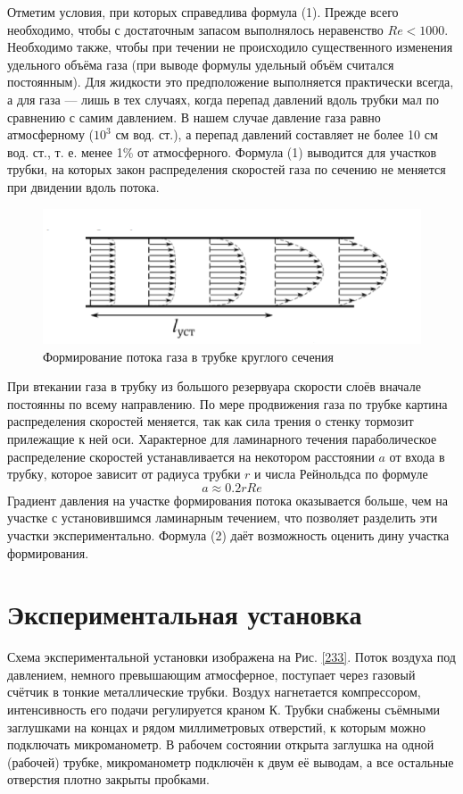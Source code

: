 \documentclass[a4paper, 12pt]{article}
\begin{document}
Отметим условия, при которых справедлива формула (1). Прежде всего необходимо, чтобы с достаточным запасом выполнялось неравенство $Re < 1000$. Необходимо также, чтобы при течении не происходило существенного изменения удельного объёма газа (при выводе формулы удельный объём считался постоянным). Для жидкости это предположение выполняется практически всегда, а для газа --- лишь в тех случаях, когда перепад давлений вдоль трубки мал по сравнению с самим давлением. В нашем случае давление газа равно атмосферному ($10^3$ см вод. ст.), а перепад давлений составляет не более 10 см вод. ст., т. е. менее 1\% от атмосферного. Формула (1) выводится для участков трубки, на которых закон распределения скоростей газа по сечению не меняется при двидении вдоль потока.
\begin{figure}[H]
\center
\includegraphics[scale=0.5]{potok.png}
\caption{Формирование потока газа в трубке круглого сечения}
\end{figure}
При втекании газа в трубку из большого резервуара скорости слоёв вначале постоянны по всему направлению. По мере продвижения газа по трубке картина распределения скоростей меняется, так как сила трения о стенку тормозит прилежащие к ней оси. Характерное для ламинарного течения параболическое распределение скоростей устанавливается на некотором расстоянии $a$ от входа в трубку, которое зависит от радиуса трубки $r$ и числа Рейнольдса по формуле 
\begin{equation}
	a \approx 0.2rRe
\end{equation}
Градиент давления на участке формирования потока оказывается больше, чем на участке с установившимся ламинарным течением, что позволяет разделить эти участки экспериментально. Формула (2) даёт возможность оценить дину участка формирования.

\section{Экспериментальная установка}

Схема экспериментальной установки изображена на Рис. \ref{233}. Поток воздуха
под давлением, немного превышающим атмосферное, поступает через газовый счётчик в тонкие металлические трубки. Воздух нагнетается компрессором, интенсивность его подачи регулируется краном К. Трубки снабжены
съёмными заглушками на концах и рядом миллиметровых отверстий, к которым можно подключать микроманометр. В рабочем состоянии открыта заглушка на одной (рабочей) трубке, микроманометр подключён к двум её выводам, а все остальные отверстия плотно закрыты пробками.
\end{document}

